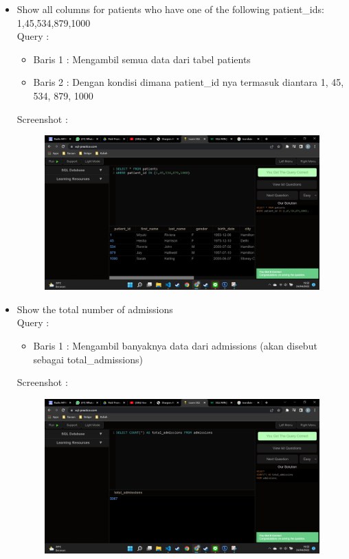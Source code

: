 \documentclass[]{article}
\begin{document}
\begin{itemize}
        \item Show all columns for patients who have one of the following patient\_ids: 1,45,534,879,1000
        \\Query :
        
        \begin{itemize}
            \item Baris 1 : Mengambil semua data dari tabel patients
            \item Baris 2 : Dengan kondisi dimana patient\_id nya termasuk diantara 1, 45, 534, 879, 1000
        \end{itemize}
        \pagebreak
        Screenshot :
        \begin{figure}[h]
            \includegraphics[scale=0.3]{./Screenshot/Easy-10.png}
            \centering
        \end{figure}

        \item Show the total number of admissions
        \\Query :
        
        \begin{itemize}
            \item Baris 1 : Mengambil banyaknya data dari admissions (akan disebut sebagai total\_admissions)
        \end{itemize}
        Screenshot :
        \begin{figure}[h]
            \includegraphics[scale=0.3]{./Screenshot/Easy-11.png}
            \centering
        \end{figure}

    \end{itemize}
\end{document}
